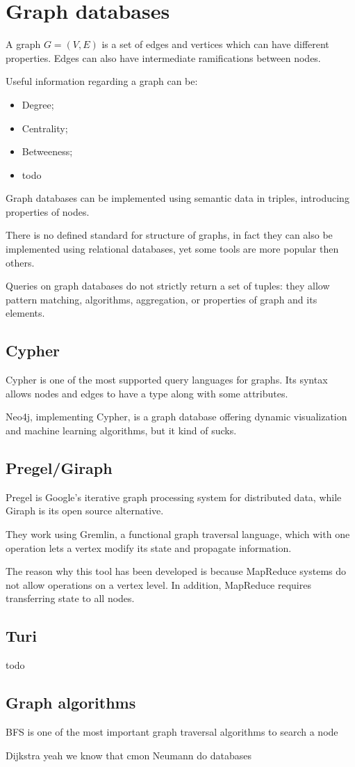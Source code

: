 \section{Graph databases}
A graph $G = (V, E)$ is a set of edges and vertices which can have different properties. Edges can also have intermediate ramifications between nodes.

Useful information regarding a graph can be:
\begin{itemize}
	\item Degree;
	\item Centrality;
	\item Betweeness;
	\item todo
\end{itemize}

Graph databases can be implemented using semantic data in triples, introducing properties of nodes.

There is no defined standard for structure of graphs, in fact they can also be implemented using relational databases, yet some tools are more popular then others. 

Queries on graph databases do not strictly return a set of tuples: they allow pattern matching, algorithms, aggregation, or properties of graph and its elements.

\subsection{Cypher}
Cypher is one of the most supported query languages for graphs. Its syntax allows nodes and edges to have a type along with some attributes.

Neo4j, implementing Cypher, is a graph database offering dynamic visualization and machine learning algorithms, but it kind of sucks.

\subsection{Pregel/Giraph}
Pregel is Google's iterative graph processing system for distributed data, while Giraph is its open source alternative.

They work using Gremlin, a functional graph traversal language, which with one operation lets a vertex modify its state and propagate information.

The reason why this tool has been developed is because MapReduce systems do not allow operations on a vertex level. In addition, MapReduce requires transferring state to all nodes.

\subsection{Turi}
todo

\subsection{Graph algorithms}
BFS is one of the most important graph traversal algorithms to search a node 

Dijkstra yeah we know that cmon Neumann do databases



